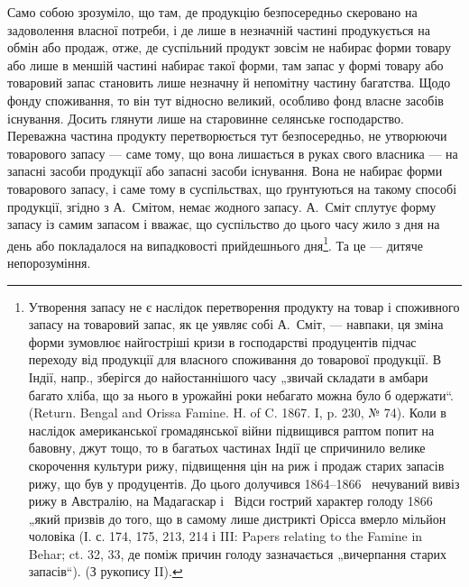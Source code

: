 Само собою зрозуміло, що там, де продукцію безпосередньо скеровано
на задоволення власної потреби, і де лише в незначній частині
продукується на обмін або продаж, отже, де суспільний продукт зовсім
не набирає форми товару або лише в меншій частині набирає такої форми,
там запас у формі товару або товаровий запас становить лише незначну
й непомітну частину багатства. Щодо фонду споживання, то він
тут відносно великий, особливо фонд власне засобів існування. Досить
глянути лише на старовинне селянське господарство. Переважна частина продукту
перетворюється тут безпосередньо, не утворюючи товарового запасу
— саме тому, що вона лишається в руках свого власника — на запасні
засоби продукції або запасні засоби існування. Вона не набирає форми
товарового запасу, і саме тому в суспільствах, що ґрунтуються на такому
способі продукції, згідно з А.~Смітом, немає жодного запасу. А.~Сміт
сплутує форму запасу із самим запасом і вважає, що суспільство до
цього часу жило з дня на день або покладалося на випадковості прийдешнього
дня\footnote{
Утворення\label{original-94} запасу не є наслідок перетворення продукту на товар і споживного запасу на товаровий
запас, як це уявляє собі А.~Сміт, — навпаки,
ця зміна форми зумовлює найгостріші кризи в господарстві продуцентів підчас
переходу від продукції для власного споживання до товарової продукції. В Індії,
напр., зберігся до найостаннішого часу „звичай складати в амбари багато хліба, що
за нього в урожайні роки небагато можна було б одержати“. (Return. Bengal and
Orissa Famine. H. of C. 1867. I, p. 230, № 74). Коли в наслідок американської
громадянської війни підвищився раптом попит на бавовну, джут тощо, то в багатьох
частинах Індії це спричинило велике скорочення культури рижу, підвищення цін
на риж і продаж старих запасів рижу, що був у продуцентів. До цього долучився
1864--1866~ нечуваний вивіз рижу в Австралію, на Мадагаскар і~ Відси
гострий характер голоду 1866~ „який призвів до того, що в самому лише
дистрикті Орісса вмерло мільйон чоловіка (І. с. 174, 175, 213, 214 і III: Papers relating
to the Famine in Behar; ct. 32, 33, де поміж причин голоду зазначається „вичерпання старих запасів“).
(З рукопису II).
}. Та це — дитяче непорозуміння.

